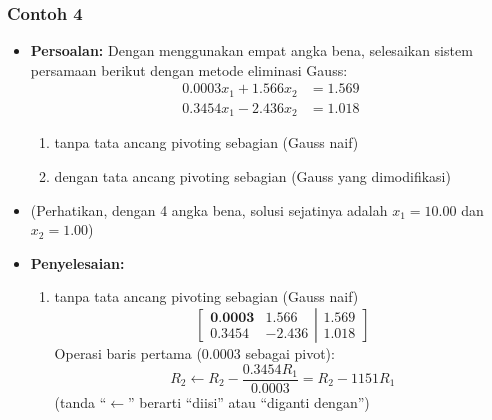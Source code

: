 \documentclass[pdflatex,compress,mathserif]{beamer}
\begin{document}
\begin{frame}
	\frametitle{Contoh 4}
	\begin{itemize}
		\item \textbf{Persoalan:} Dengan menggunakan empat angka bena, selesaikan sistem persamaan berikut dengan metode eliminasi Gauss:
		\begin{align*}
			0.0003x_1 + 1.566x_2 &= 1.569 \\
			0.3454x_1 - 2.436x_2 &= 1.018
		\end{align*}
		\begin{enumerate}
			\item tanpa tata ancang pivoting sebagian (Gauss naif)
			\item dengan tata ancang pivoting sebagian (Gauss yang dimodifikasi)
		\end{enumerate}
		\item (Perhatikan, dengan 4 angka bena, solusi sejatinya adalah $ x_1 = 10.00 $ dan $ x_2 = 1.00 $)
	\end{itemize}
\end{frame}

\begin{frame}
	\begin{itemize}
		\item \textbf{Penyelesaian:}
		\begin{enumerate}
			\item tanpa tata ancang pivoting sebagian (Gauss naif)
			\[
			\left[
				\begin{matrix}
				\textbf{0.0003} & 1.566 \\
				0.3454 & -2.436
				\end{matrix}
			\right|			
			\left.
			\begin{matrix}
				1.569 \\ 1.018
			\end{matrix}
			\right]
			\]
			Operasi baris pertama (0.0003 sebagai pivot):
			\[ R_2 \leftarrow R_2 - \frac{0.3454 R_1}{0.0003} = R_2 - 1151R_1\]
			(tanda “$\leftarrow$” berarti “diisi” atau “diganti dengan”)
		\end{enumerate}
	\end{itemize}
\end{frame}
\end{document}
